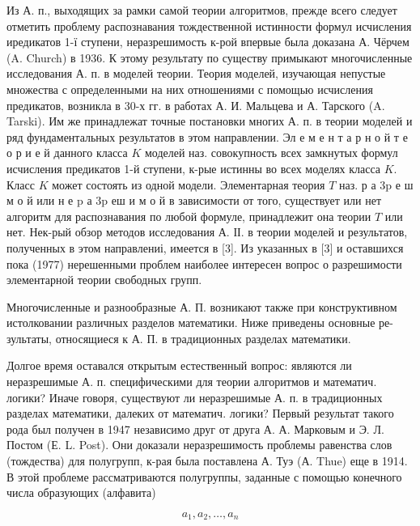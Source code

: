 \documentclass[10pt]{article}
\begin{document}
Из А. п., выходящих за рамки самой теории алгоритмов, прежде всего следует отметить проблему распознавания тождественной истинности формул исчисления иредикатов 1-ї ступени, неразрешимость к-рой впервые была доказана А. Чёрчем (A. Church) в 1936. К этому результату по существу примыкают многочисленные исследования А. п. в моделей теории. Теория моделей, изучающая непустые множества с определенными на них отношениями с помощью исчисления предикатов, возникла в 30-х гг. в работах А. И. Мальцева и А. Тарского (A. Tarski). Им же принадлежат точные постановки многих А. п. в теории моделей и ряд фундаментальных результатов в этом направлении. Эл е м е н т а р н о й т е о р и е й данного класса $K$ моделей наз. совокупность всех замкнутых формул исчисления предикатов 1-й ступени, к-рые истинны во всех моделях класса $K$. Класс $K$ может состоять из одной модели. Элементарная теория $T$ наз. р а $3 \mathrm{p}$ е ш м о й или н е $\mathrm{p}$ а $3 \mathrm{p}$ еш и м о й в зависимости от того, существует или нет алгоритм для распознавания по любой формуле, принадлежит она теории $T$ или нет. Нек-рый обзор методов исследования А. ІІ. в теории моделей и результатов, полученных в этом направлениі, имеется в [3]. Из указанных в [3] и оставшихся пока (1977) нерешенными проблем наиболее интересен вопрос о разрешимости элементарной теории свободных групп.



Многочисленные и разнообразные А. П. возникают также при конструктивном истолковании различных разделов математики. Ниже приведены основные ре- зультаты, относящиеся к А. П. в традиционных разделах математики.



Долгое время оставался открытым естественный вопрос: являются ли неразрешимые А. п. специфическими для теории алгоритмов и математич. логики? Иначе говоря, существуют ли неразрешимые А. п. в традиционных разделах математики, далеких от математич. логики? Первый результат такого рода был получен в 1947 независимо друг от друга А. А. Марковым и Э. Л. Постом (Е. L. Post). Они доказали неразрешимость проблемы равенства слов (тождества) для полугрупп, к-рая была поставлена А. Туэ (А. Thue) еще в 1914. В этой проблеме рассматриваются полугруппы, заданные с помощью конечного числа образующих (алфавита)



\[

a_{1}, a_{2}, \ldots, a_{n}

\]
\end{document}
